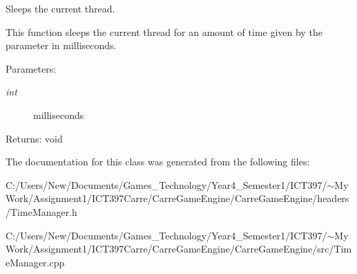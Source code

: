 Sleeps the current thread. 

This function sleeps the current thread for an amount of time given by the parameter in milliseconds.

\begin{Desc}
\item[Parameters:]
\begin{description}
\item[{\em int}]milliseconds \end{description}
\end{Desc}
\begin{Desc}
\item[Returns:]void \end{Desc}


The documentation for this class was generated from the following files:\begin{CompactItemize}
\item 
C:/Users/New/Documents/Games\_\-Technology/Year4\_\-Semester1/ICT397/$\sim$My Work/Assignment1/ICT397Carre/CarreGameEngine/CarreGameEngine/headers/TimeManager.h\item 
C:/Users/New/Documents/Games\_\-Technology/Year4\_\-Semester1/ICT397/$\sim$My Work/Assignment1/ICT397Carre/CarreGameEngine/CarreGameEngine/src/TimeManager.cpp\end{CompactItemize}

